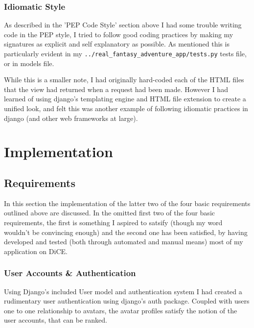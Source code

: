 \documentclass[11pt,a4paper]{article}
\begin{document}
\subsubsection{Idiomatic Style}
As described in the 'PEP Code Style' section above I had some trouble writing code in the PEP style, I tried to follow good coding practices by making my signatures as explicit and self explanatory as possible. As mentioned this is particularly evident in my \verb|../real_fantasy_adventure_app/tests.py| tests file, or in models file.

While this is a smaller note, I had originally hard-coded each of the HTML files that the view had returned when a request had been made. However I had learned of using django's templating engine and HTML file extension to create a unified look, and felt this was another example of following idiomatic practices in django (and other web frameworks at large).

\section{Implementation}
\subsection{Requirements}
In this section the implementation of the latter two of the four basic requirements outlined above are discussed. In the omitted first two of the four basic requirements, the first is something I aspired to satsify (though my word wouldn't be convincing enough) and the second one has been satisfied, by having developed and tested (both through automated and manual means) most of my application on DiCE.

\subsubsection{User Accounts \& Authentication}
Using Django's included User model and authentication system I had created a rudimentary user authentication using django's auth package. Coupled with users one to one relationship to avatars, the avatar profiles satisfy the notion of the user accounts, that can be ranked.
\end{document}
